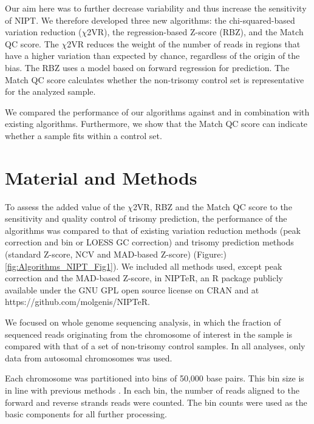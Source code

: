 Our aim here was to further decrease variability and thus increase the sensitivity of NIPT. 
We therefore developed three new algorithms: the chi-squared-based variation reduction ($\chi$2VR), the regression-based Z-score (RBZ), and the Match QC score. 
The $\chi$2VR reduces the weight of the number of reads in regions that have a higher variation than expected by chance, regardless of the origin of the bias. 
The RBZ uses a model based on forward regression for prediction. 
The Match QC score calculates whether the non-trisomy control set is representative for the analyzed sample.

We compared the performance of our algorithms against and in combination with existing algorithms. 
Furthermore, we show that the Match QC score can indicate whether a sample fits within a control set.


\section{Material and Methods}\label{Methods}
To assess the added value of the $\chi$2VR, RBZ and the Match QC score to the sensitivity and quality control of trisomy prediction, the performance of the algorithms was compared to that of existing variation reduction methods (peak correction and bin or LOESS GC correction) and trisomy prediction methods (standard Z-score, NCV and MAD-based Z-score) (Figure:)\ref{fig:Algorithms_NIPT_Fig1}). 
We included all methods used, except peak correction and the MAD-based Z-score, in NIPTeR, an R package publicly available under the GNU GPL open source license on CRAN and at https://github.com/molgenis/NIPTeR.

We focused on whole genome sequencing analysis, in which the fraction of sequenced reads originating from the chromosome of interest in the sample is compared with that of a set of non-trisomy control samples. 
In all analyses, only data from autosomal chromosomes was used.

Each chromosome was partitioned into bins of 50,000 base pairs. This bin size is in line with previous methods \cite{Fan_2008,Chen_2011,Lau_2012,Palomaki_2012,Fan_2010}. 
In each bin, the number of reads aligned to the forward and reverse strands reads were counted. The bin counts were used as the basic components for all further processing.

